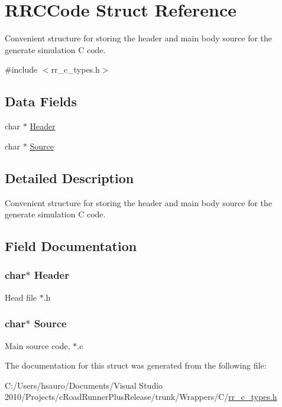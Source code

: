 \hypertarget{struct_r_r_c_code}{
\section{\-R\-R\-C\-Code \-Struct \-Reference}
\label{struct_r_r_c_code}
}


\-Convenient structure for storing the header and main body source for the generate simulation \-C code.  




{\ttfamily \#include $<$rr\-\_\-c\-\_\-types.\-h$>$}

\subsection*{\-Data \-Fields}
\begin{DoxyCompactItemize}
\item 
char $\ast$ \hyperlink{struct_r_r_c_code_a129503fa396e877e8400bb7cdc9774b5}{\-Header}
\item 
char $\ast$ \hyperlink{struct_r_r_c_code_a23fa2e731d8e1576c9095868b9651305}{\-Source}
\end{DoxyCompactItemize}


\subsection{\-Detailed \-Description}
\-Convenient structure for storing the header and main body source for the generate simulation \-C code. 

\subsection{\-Field \-Documentation}
\hypertarget{struct_r_r_c_code_a129503fa396e877e8400bb7cdc9774b5}{
\subsubsection[{\-Header}]{\setlength{\rightskip}{0pt plus 5cm}char$\ast$ {\bf \-Header}}}
\label{struct_r_r_c_code_a129503fa396e877e8400bb7cdc9774b5}
\-Head file $\ast$.h \hypertarget{struct_r_r_c_code_a23fa2e731d8e1576c9095868b9651305}{
\subsubsection[{\-Source}]{\setlength{\rightskip}{0pt plus 5cm}char$\ast$ {\bf \-Source}}}
\label{struct_r_r_c_code_a23fa2e731d8e1576c9095868b9651305}
\-Main source code, $\ast$.c 

\-The documentation for this struct was generated from the following file\-:\begin{DoxyCompactItemize}
\item 
\-C\-:/\-Users/hsauro/\-Documents/\-Visual Studio 2010/\-Projects/c\-Road\-Runner\-Plus\-Release/trunk/\-Wrappers/\-C/\hyperlink{rr__c__types_8h}{rr\-\_\-c\-\_\-types.\-h}\end{DoxyCompactItemize}

